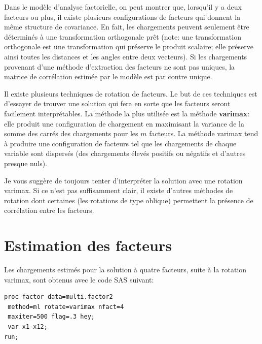 \documentclass[
]{book}
\theoremstyle{definition}
\theoremstyle{definition}
\theoremstyle{definition}
\theoremstyle{remark}
\begin{document}
Dans le modèle d'analyse factorielle, on peut montrer que, lorsqu'il y a deux facteurs ou plus, il existe plusieurs configurations de facteurs qui donnent la même structure de covariance. En fait, les chargements peuvent seulement être déterminés à une transformation orthogonale prêt (note: une transformation orthogonale est une transformation qui préserve le produit scalaire; elle préserve ainsi toutes les distances et les angles entre deux vecteurs). Si les chargements provenant d'une méthode d'extraction des facteurs ne sont pas uniques, la matrice de corrélation estimée par le modèle est par contre unique.

Il existe plusieurs techniques de rotation de facteurs. Le but de ces techniques est d'essayer de trouver une solution qui fera en sorte que les facteurs seront facilement interprétables. La méthode la plus utilisée est la méthode \textbf{varimax}: elle produit une configuration de chargement en maximisant la variance de la somme des carrés des chargements pour les \(m\) facteurs. La méthode varimax tend à produire une configuration de facteurs tel que les chargements de chaque variable sont dispersés (des chargements élevés positifs ou négatifs et d'autres presque nuls).

Je vous suggère de toujours tenter d'interpréter la solution avec une rotation varimax. Si ce n'est pas suffisamment clair, il existe d'autres méthodes de rotation dont certaines (les rotations de type oblique) permettent la présence de corrélation entre les facteurs.

\hypertarget{estimation-des-facteurs}{%
\section{Estimation des facteurs}\label{estimation-des-facteurs}}

Les chargements estimés pour la solution à quatre facteurs, suite à la rotation varimax, sont obtenus avec le code SAS suivant:

\begin{verbatim}
proc factor data=multi.factor2 
 method=ml rotate=varimax nfact=4
 maxiter=500 flag=.3 hey;
 var x1-x12;
run;
\end{verbatim}
\end{document}
